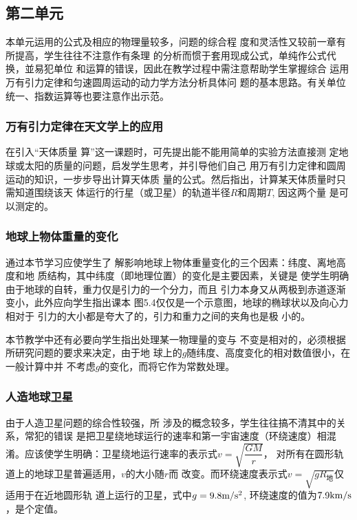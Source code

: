\subsection{第二单元}
本单元运用的公式及相应的物理量较多，问题的综合程
度和灵活性又较前一章有所提高，学生往往不注意作有条理
的分析而惯于套用现成公式，单纯作公式代换，並易犯单位
和运算的错误，因此在教学过程中需注意帮助学生掌握综合
运用万有引力定律和匀速圆周运动的动力学方法分析具体问
题的基本思路。有关单位统一、指数运算等也要注意作出示范。

\subsubsection{万有引力定律在天文学上的应用} 

在引入“天体质量
算”这一课题时，可先提出能不能用简单的实验方法直接测
定地球或太阳的质量的问题，启发学生思考，并引导他们自己
用万有引力定律和圆周运动的知识，一步步导出计算天体质
量的公式。然后指出，计算某天体质量时只需知道围绕该天
体运行的行星（或卫星）的轨道半径$R$和周期$T$, 因这两个量
是可以测定的。

\subsubsection{地球上物体重量的变化}

通过本节学习应使学生了
解影响地球上物体重量变化的三个因素：纬度、离地高度和地
质结构，其中纬度（即地理位置）的变化是主要因素，关键是
使学生明确由于地球的自转，重力仅是引力的一个分力，而且
引力本身又从两极到赤道逐渐变小，此外应向学生指出课本
图5.4仅仅是一个示意图，地球的椭球状以及向心力相对于
引力的大小都是夸大了的，引力和重力之间的夹角也是极
小的。

本节教学中还有必要向学生指出处理某一物理量的变与
不变是相对的，必须根据所研究问题的要求来决定，由于地
球上的$g$随纬度、高度变化的相对数值很小，在一般计算中并
不考虑$g$的变化，而将它作为常数处理。


\subsubsection{人造地球卫星}

由于人造卫星问题的综合性较强，所
涉及的概念较多，学生往往搞不清其中的关系，常犯的错误
是把卫星绕地球运行的速率和第一宇宙速度（环绕速度）相混
淆。应该使学生明确：卫星绕地运行速率的表示式$v=\sqrt{\dfrac{GM}{r}}$，
对所有在圆形轨道上的地球卫星普遍适用，$v$的大小随$r$而
改变。而环绕速度表示式$v=\sqrt{gR_{\text{地}}}$仅适用于在近地圆形轨
道上运行的卫星，式中$g=9.8\text{m}/\text{s}^2$, 环绕速度的值为$7.9{\rm km/s}$，是个定值。


